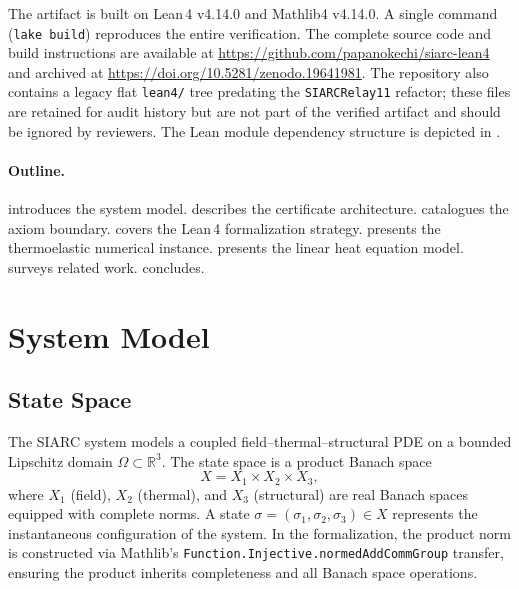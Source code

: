 \documentclass[11pt,a4paper]{article}
\theoremstyle{plain}
\theoremstyle{definition}
\theoremstyle{remark}
\newcommand{\R}{\mathbb{R}}
\newcommand{\leaninline}[1]{\texttt{#1}}
\begin{document}
The artifact is built on Lean\,4 v4.14.0 and Mathlib4 v4.14.0.  A
single command (\texttt{lake build}) reproduces the entire verification.
The complete source code and build instructions are available at
\url{https://github.com/papanokechi/siarc-lean4} and archived at
\url{https://doi.org/10.5281/zenodo.19641981}.
The repository also contains a legacy flat \texttt{lean4/}
tree predating the \texttt{SIARCRelay11} refactor; these
files are retained for audit history but are not part of
the verified artifact and should be ignored by reviewers.
The Lean module dependency structure is depicted in .

\paragraph{Outline.}
 introduces the system model.
 describes the certificate architecture.
 catalogues the axiom boundary.
 covers the Lean\,4 formalization strategy.
 presents the thermoelastic numerical instance.
 presents the linear heat equation model.
 surveys related work.
 concludes.


\section{System Model}\label{sec:model}

\subsection{State Space}

The SIARC system models a coupled field--thermal--structural PDE on a
bounded Lipschitz domain $\Omega \subset \R^3$.  The state space is a
product Banach space
\begin{equation}\label{eq:state-space}
  X = X_1 \times X_2 \times X_3,
\end{equation}
where $X_1$ (field), $X_2$ (thermal), and $X_3$ (structural) are real
Banach spaces equipped with complete norms.  A state
$\sigma = (\sigma_1, \sigma_2, \sigma_3) \in X$ represents the
instantaneous configuration of the system.  In the formalization, the
product norm is constructed via Mathlib's
\leaninline{Function.Injective.normedAddCommGroup} transfer, ensuring
the product inherits completeness and all Banach space operations.
\end{document}
